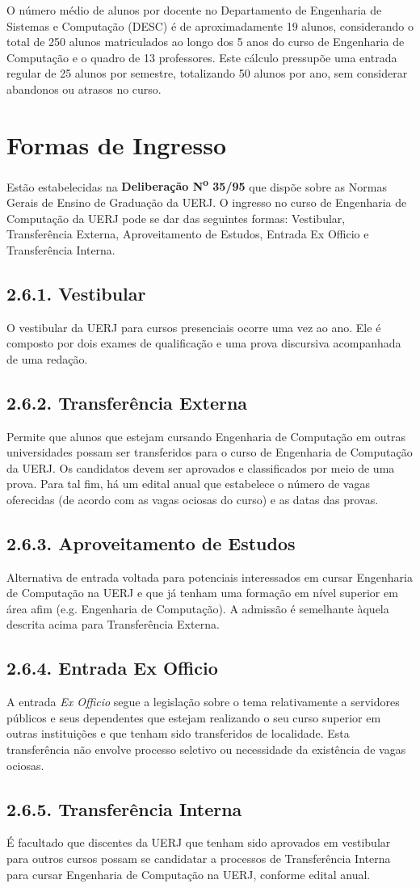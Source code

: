 O número médio de alunos por docente no Departamento de Engenharia de Sistemas e Computação (DESC) é de aproximadamente 19 alunos, considerando o total de 250 alunos matriculados ao longo dos 5 anos do curso de Engenharia de Computação e o quadro de 13 professores. Este cálculo pressupõe uma entrada regular de 25 alunos por semestre, totalizando 50 alunos por ano, sem considerar abandonos ou atrasos no curso.  

\section{Formas de Ingresso}

Estão estabelecidas na \textbf{Deliberação N\textsuperscript{o} 35/95} que dispõe sobre as Normas Gerais de Ensino de Graduação da UERJ. O ingresso no curso de Engenharia de Computação da UERJ pode se dar das seguintes formas: Vestibular, Transferência Externa, Aproveitamento de Estudos, Entrada Ex Officio e Transferência Interna.

\subsection*{2.6.1. Vestibular}
O vestibular da UERJ para cursos presenciais ocorre uma vez ao ano. Ele é composto por dois exames de qualificação e uma prova discursiva acompanhada de uma redação.

\subsection*{2.6.2. Transferência Externa}
Permite que alunos que estejam cursando Engenharia de Computação em outras universidades possam ser transferidos para o curso de Engenharia de Computação da UERJ. Os candidatos devem ser aprovados e classificados por meio de uma prova. Para tal fim, há um edital anual que estabelece o número de vagas oferecidas (de acordo com as vagas ociosas do curso) e as datas das provas.

\subsection*{2.6.3. Aproveitamento de Estudos}
Alternativa de entrada voltada para potenciais interessados em cursar Engenharia de Computação na UERJ e que já tenham uma formação em nível superior em área afim (e.g. Engenharia de Computação). A admissão é semelhante àquela descrita acima para Transferência Externa.

\subsection*{2.6.4. Entrada Ex Officio}
A entrada \textit{Ex Officio} segue a legislação sobre o tema relativamente a servidores públicos e seus dependentes que estejam realizando o seu curso superior em outras instituições e que tenham sido transferidos de localidade. Esta transferência não envolve processo seletivo ou necessidade da existência de vagas ociosas.

\subsection*{2.6.5. Transferência Interna}
É facultado que discentes da UERJ que tenham sido aprovados em vestibular para outros cursos possam se candidatar a processos de Transferência Interna para cursar Engenharia de Computação na UERJ, conforme edital anual.




